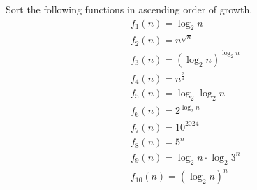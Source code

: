 \problem{}

Sort the following functions in ascending order of growth.
\begin{align}
    &f_1(n)=\log_2{n} \\
    &f_2(n)=n^{\sqrt{n}} \\
    &f_3(n)=(\log_2{n})^{\log_2{n}} \\
    &f_4(n)=n^{\frac{3}{4}}  \\
    &f_5(n)=\log_2{\log_2{n}} \\
    &f_6(n)=2^{\log_2{n}}  \\
    &f_7(n)=10^{2024}  \\
    &f_8(n)=5^n \\
    &f_9(n)=\log_2{n}\cdot\log_2{3^n} \\
    &f_{10}(n)=(\log_2{n})^n
\end{align}

\solution{

}

\newpage